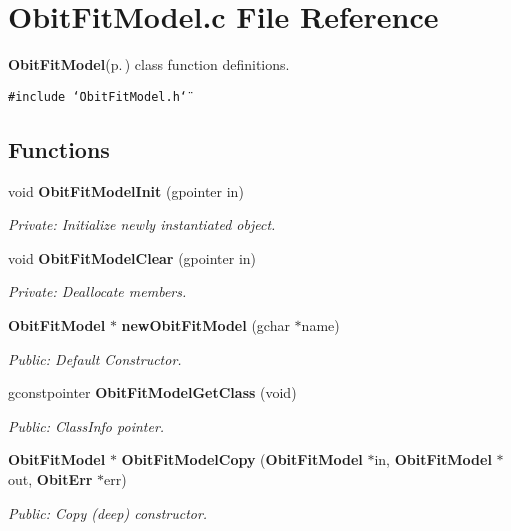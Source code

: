 \section{Obit\-Fit\-Model.c File Reference}
\label{ObitFitModel_8c}
{\bf Obit\-Fit\-Model}{\rm (p.\,\pageref{structObitFitModel})} class function definitions. 

{\tt \#include \char`\"{}Obit\-Fit\-Model.h\char`\"{}}\par
\subsection*{Functions}
\begin{CompactItemize}
\item 
void {\bf Obit\-Fit\-Model\-Init} (gpointer in)
\begin{CompactList}\small\item\em Private: Initialize newly instantiated object. \item\end{CompactList}\item 
void {\bf Obit\-Fit\-Model\-Clear} (gpointer in)
\begin{CompactList}\small\item\em Private: Deallocate members. \item\end{CompactList}\item 
{\bf Obit\-Fit\-Model} $\ast$ {\bf new\-Obit\-Fit\-Model} (gchar $\ast$name)
\begin{CompactList}\small\item\em Public: Default Constructor. \item\end{CompactList}\item 
gconstpointer {\bf Obit\-Fit\-Model\-Get\-Class} (void)
\begin{CompactList}\small\item\em Public: Class\-Info pointer. \item\end{CompactList}\item 
{\bf Obit\-Fit\-Model} $\ast$ {\bf Obit\-Fit\-Model\-Copy} ({\bf Obit\-Fit\-Model} $\ast$in, {\bf Obit\-Fit\-Model} $\ast$out, {\bf Obit\-Err} $\ast$err)
\begin{CompactList}\small\item\em Public: Copy (deep) constructor. \item\end{CompactList}\item 

\end{CompactItemize}
